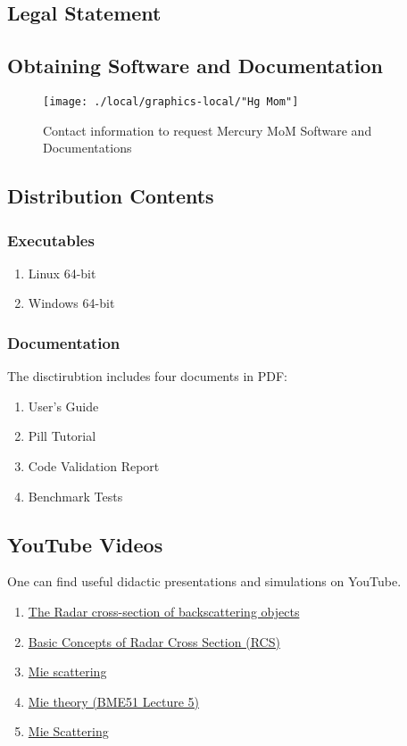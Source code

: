 \documentclass[10pt, oneside]{article}   	%
\begin{document}
\subsection{Legal Statement}


\subsection{Obtaining Software and Documentation}
\begin{figure}[htbp]
\begin{center}
	\texttt{[image: ./local/graphics-local/"Hg Mom"]}
\caption{Contact information to request Mercury MoM Software and Documentations}
\label{fig:kam-miller}
\end{center}
\end{figure}

\subsection{Distribution Contents}
\subsubsection{Executables}
\begin{enumerate}
	\item Linux 64-bit
	\item Windows 64-bit
\end{enumerate}

\subsubsection{Documentation}
The disctirubtion includes four documents in PDF:
\begin{enumerate}
	\item User's Guide
	\item Pill Tutorial
	\item Code Validation Report
	\item Benchmark Tests
\end{enumerate}

\subsection{YouTube Videos}
One can find useful didactic presentations and simulations on YouTube.
\begin{enumerate}
	\item \href{https://www.youtube.com/watch?v=ujyoJSzwmQw}{The Radar cross-section of backscattering objects}
	\item \href{https://www.youtube.com/watch?v=0g5x4pXBid8}{Basic Concepts of Radar Cross Section (RCS)}
	\item \href{https://www.youtube.com/watch?v=mM-QDN68ebc}{Mie scattering}
	\item \href{https://www.youtube.com/watch?v=ayI6W6-ypUM&list=PLzD7pNQo-MGzkBnp1HVTGXaIQzWvkJ0M8}{Mie theory (BME51 Lecture 5)}
	\item \href{https://www.youtube.com/shorts/ggMoo8wH1_o}{Mie Scattering}
\end{enumerate}
\end{document}
